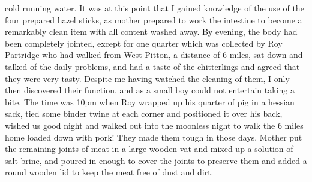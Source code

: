 cold running water. It was at this point that I gained knowledge of the use of
the four prepared hazel sticks, as mother prepared to work the intestine to
become a remarkably clean item with all content washed away. By evening, the
body had been completely jointed, except for one quarter which was collected by
Roy Partridge who had walked from West Pitton, a distance of 6 miles, sat down
and talked of the daily problems, and had a taste of the chitterlings and
agreed that they were very tasty. Despite me having watched the cleaning of
them, I only then discovered their function, and as a small boy could not
entertain taking a bite. The time was 10pm when Roy wrapped up his quarter of
pig in a hessian sack, tied some binder twine at each corner and positioned it
over his back, wished us good night and walked out into the moonless night to
walk the 6 miles home loaded down with pork! They made them tough in those
days. Mother put the remaining joints of meat in a large wooden vat and mixed
up a solution of salt brine, and poured in enough to cover the joints to
preserve them and added a round wooden lid to keep the meat free of dust and
dirt.

